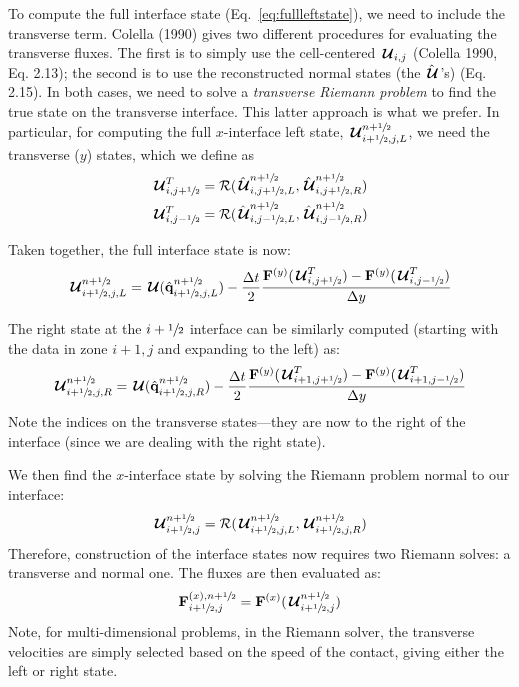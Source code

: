 To compute the full interface state (Eq.~\ref{eq:fullleftstate}), we
need to include the transverse term.
Colella (1990) gives two different procedures for evaluating the
transverse fluxes.  The first is to simply use the cell-centered
${\,\boldsymbol{\mathcal{U}}}_{i,j}$ (Colella 1990,
Eq. 2.13); the second is to use the reconstructed normal states (the
$\hat{{\,\boldsymbol{\mathcal{U}}}}$'s) (Eq. 2.15).  In both cases, we need to solve a {\em
  transverse Riemann problem} to find the true state on the transverse
interface.  This latter approach is what we prefer.  In particular,
for computing the full $x$-interface left state, ${\,\boldsymbol{\mathcal{U}}}_{i+{\sfrac{1}{2}},j,L}^{n+{\sfrac{1}{2}}}$, we need the
transverse ($y$) states, which we define as
\begin{align}
{\,\boldsymbol{\mathcal{U}}}^T_{i,j+{\sfrac{1}{2}}} &= \mathcal{R}(\hat{{\,\boldsymbol{\mathcal{U}}}}^{n+{\sfrac{1}{2}}}_{i,j+{\sfrac{1}{2}},L},
                            \hat{{\,\boldsymbol{\mathcal{U}}}}^{n+{\sfrac{1}{2}}}_{i,j+{\sfrac{1}{2}},R}) \\
{\,\boldsymbol{\mathcal{U}}}^T_{i,j-{\sfrac{1}{2}}} &= \mathcal{R}(\hat{{\,\boldsymbol{\mathcal{U}}}}^{n+{\sfrac{1}{2}}}_{i,j-{\sfrac{1}{2}},L},
                            \hat{{\,\boldsymbol{\mathcal{U}}}}^{n+{\sfrac{1}{2}}}_{i,j-{\sfrac{1}{2}},R})
\end{align}

Taken together, the full interface state is now:
\begin{equation}
{\,\boldsymbol{\mathcal{U}}}_{i+{\sfrac{1}{2}},j,L}^{n+{\sfrac{1}{2}}} = {\,\boldsymbol{\mathcal{U}}}(\hat{{\bf q}}_{i+{\sfrac{1}{2}},j,L}^{n+{\sfrac{1}{2}}})
   - \frac{\Delta t}{2} \frac{{\bf F}^{(y)}({\,\boldsymbol{\mathcal{U}}}^T_{i,j+{\sfrac{1}{2}}}) - {\bf F}^{(y)}({\,\boldsymbol{\mathcal{U}}}^T_{i,j-{\sfrac{1}{2}}})}{\Delta y}
\end{equation}

The right state at the $i+{\sfrac{1}{2}}$ interface can be similarly computed (starting with the
data in zone $i+1,j$ and expanding to the left) as:
\begin{equation}
{\,\boldsymbol{\mathcal{U}}}_{i+{\sfrac{1}{2}},j,R}^{n+{\sfrac{1}{2}}} = {\,\boldsymbol{\mathcal{U}}}(\hat{{\bf q}}_{i+{\sfrac{1}{2}},j,R}^{n+{\sfrac{1}{2}}})
   - \frac{\Delta t}{2} \frac{{\bf F}^{(y)}({\,\boldsymbol{\mathcal{U}}}^T_{i+1,j+{\sfrac{1}{2}}}) - {\bf F}^{(y)}({\,\boldsymbol{\mathcal{U}}}^T_{i+1,j-{\sfrac{1}{2}}})}{\Delta y}
\end{equation}
Note the indices on the transverse states---they are now to the right of the interface (since
we are dealing with the right state).

We then find the $x$-interface state by solving the Riemann problem
normal to our interface:
\begin{equation}
{\,\boldsymbol{\mathcal{U}}}_{i+{\sfrac{1}{2}},j}^{n+{\sfrac{1}{2}}} = \mathcal{R}({\,\boldsymbol{\mathcal{U}}}_{i+{\sfrac{1}{2}},j,L}^{n+{\sfrac{1}{2}}}, {\,\boldsymbol{\mathcal{U}}}_{i+{\sfrac{1}{2}},j,R}^{n+{\sfrac{1}{2}}})
\end{equation}
Therefore, construction of the interface states now requires two
Riemann solves: a transverse and normal one.  The fluxes are then evaluated as:
\begin{equation}
{\bf F}^{(x),n+{\sfrac{1}{2}}}_{i+{\sfrac{1}{2}},j} = {\bf F}^{(x)}({\,\boldsymbol{\mathcal{U}}}_{i+{\sfrac{1}{2}},j}^{n+{\sfrac{1}{2}}})
\end{equation}
Note, for multi-dimensional problems, in the Riemann solver, the transverse
velocities are simply selected based on the speed of the contact, giving
either the left or right state.

